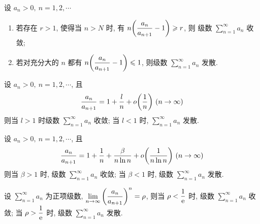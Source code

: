 \begin{theorem}
    设 $a_n>0,~n=1,2, \cdots $\begin{enumerate}[label=(\arabic{*})]
        \item 若存在 $r>1$, 使得当 $n>N$ 时, 有 $n\qty(\dfrac{a_n}{a_{n+1}}-1)\geqslant r$, 则 级数 $\displaystyle \sum_{n=1}^{\infty}a_n$ 收敛;
        \item 若对充分大的 $n$ 都有 $n\qty(\dfrac{a_n}{a_{n+1}}-1)\leqslant 1$, 则级数 $\displaystyle \sum_{n=1}^{\infty}a_n$ 发散.
    \end{enumerate}
\end{theorem}

\begin{theorem}
    设 $a_n>0,~n=1,2, \cdots $, 且 $$\dfrac{a_n}{a_{n+1}}=1+\dfrac{l}{n}+o\qty(\dfrac{1}{n}) ~(n\to \infty)$$ 则当 $l>1$ 时级数 $\displaystyle \sum_{n=1}^{\infty} a_n$ 收敛; 当 $l<1$ 时, $\displaystyle \sum_{n=1}^{\infty} a_n$ 发散.
\end{theorem}

\begin{theorem}
    设 $a_n>0,~n=1,2, \cdots $, 且 $$
        \dfrac{a_n}{a_{n+1}}=1+\dfrac{1}{n}+\dfrac{\beta}{n\ln n}+o\qty(\dfrac{1}{n\ln n})~(n\to \infty)
    $$
    则当 $\beta>1$ 时, 级数 $\displaystyle \sum_{n=1}^{\infty} a_n$ 收敛; 当 $\beta<1$ 时, 级数 $\displaystyle \sum_{n=1}^{\infty} a_n$ 发散.
\end{theorem}

\begin{theorem}
    设 $\displaystyle \sum_{n=1}^{\infty} a_n$ 为正项级数, $\displaystyle \lim_{n \to \infty}\qty(\dfrac{a_n}{a_{n+1}})^{n}=\rho$,
    则当 $\rho<\dfrac{1}{\mathrm{e}}$ 时, 级数 $\displaystyle \sum_{n=1}^{\infty} a_n$ 收敛; 当 $\rho>\dfrac{1}{\mathrm{e}}$ 时, 级数 $\displaystyle \sum_{n=1}^{\infty} a_n$ 发散.
\end{theorem}

